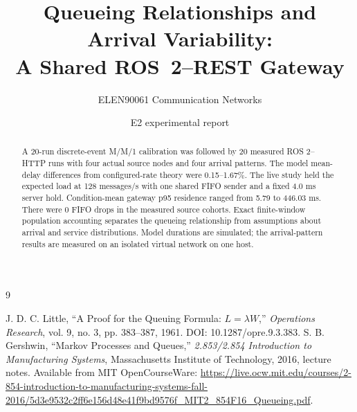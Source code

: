 \documentclass[11pt,a4paper]{article}
\title{Queueing Relationships and Arrival Variability:\\A Shared ROS~2--REST Gateway}
\author{ELEN90061 Communication Networks}
\date{E2 experimental report}
\begin{document}
\maketitle
\begin{abstract}
A 20-run discrete-event M/M/1 calibration was followed by 20 measured ROS 2--HTTP runs with four actual source nodes and four arrival patterns. The model mean-delay differences from configured-rate theory were 0.15--1.67\%. The live study held the expected load at 128 messages/s with one shared FIFO sender and a fixed 4.0 ms server hold. Condition-mean gateway p95 residence ranged from 5.79 to 446.03 ms. There were 0 FIFO drops in the measured source cohorts. Exact finite-window population accounting separates the queueing relationship from assumptions about arrival and service distributions. Model durations are simulated; the arrival-pattern results are measured on an isolated virtual network on one host.
\end{abstract}

\begin{thebibliography}{9}\raggedright
{} J. D. C. Little, ``A Proof for the Queuing Formula: $L=\lambda W$,'' \textit{Operations Research}, vol. 9, no. 3, pp. 383--387, 1961. DOI: 10.1287/opre.9.3.383.
 S. B. Gershwin, ``Markov Processes and Queues,'' \textit{2.853/2.854 Introduction to Manufacturing Systems}, Massachusetts Institute of Technology, 2016, lecture notes. Available from MIT OpenCourseWare: \url{https://live.ocw.mit.edu/courses/2-854-introduction-to-manufacturing-systems-fall-2016/5d3e9532c2ff6e156d48e41f9bd9576f_MIT2_854F16_Queueing.pdf}.
\end{thebibliography}
\end{document}
